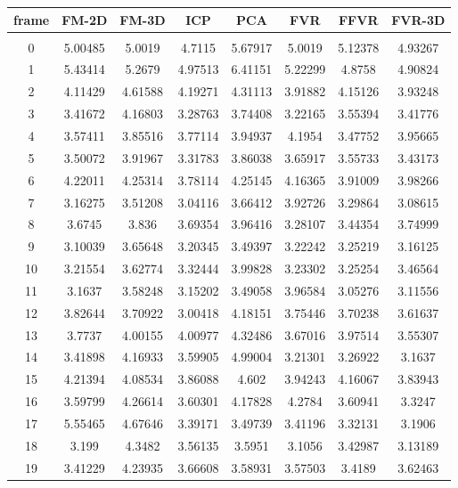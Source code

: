 \begin{center}
\begin{longtable}{cccccccc}
\hline
\textbf{frame} & \textbf{FM-2D} & \textbf{FM-3D} & \textbf{ICP} & \textbf{PCA} & \textbf{FVR} & \textbf{FFVR} & \textbf{FVR-3D} \\
\hline \\
0 & 5.00485 & 5.0019 & 4.7115 & 5.67917 & 5.0019 & 5.12378 & 4.93267\\
1 & 5.43414 & 5.2679 & 4.97513 & 6.41151 & 5.22299 & 4.8758 & 4.90824\\
2 & 4.11429 & 4.61588 & 4.19271 & 4.31113 & 3.91882 & 4.15126 & 3.93248\\
3 & 3.41672 & 4.16803 & 3.28763 & 3.74408 & 3.22165 & 3.55394 & 3.41776\\
4 & 3.57411 & 3.85516 & 3.77114 & 3.94937 & 4.1954 & 3.47752 & 3.95665\\
5 & 3.50072 & 3.91967 & 3.31783 & 3.86038 & 3.65917 & 3.55733 & 3.43173\\
6 & 4.22011 & 4.25314 & 3.78114 & 4.25145 & 4.16365 & 3.91009 & 3.98266\\
7 & 3.16275 & 3.51208 & 3.04116 & 3.66412 & 3.92726 & 3.29864 & 3.08615\\
8 & 3.6745 & 3.836 & 3.69354 & 3.96416 & 3.28107 & 3.44354 & 3.74999\\
9 & 3.10039 & 3.65648 & 3.20345 & 3.49397 & 3.22242 & 3.25219 & 3.16125\\
10 & 3.21554 & 3.62774 & 3.32444 & 3.99828 & 3.23302 & 3.25254 & 3.46564\\
11 & 3.1637 & 3.58248 & 3.15202 & 3.49058 & 3.96584 & 3.05276 & 3.11556\\
12 & 3.82644 & 3.70922 & 3.00418 & 4.18151 & 3.75446 & 3.70238 & 3.61637\\
13 & 3.7737 & 4.00155 & 4.00977 & 4.32486 & 3.67016 & 3.97514 & 3.55307\\
14 & 3.41898 & 4.16933 & 3.59905 & 4.99004 & 3.21301 & 3.26922 & 3.1637\\
15 & 4.21394 & 4.08534 & 3.86088 & 4.602 & 3.94243 & 4.16067 & 3.83943\\
16 & 3.59799 & 4.26614 & 3.60301 & 4.17828 & 4.2784 & 3.60941 & 3.3247\\
17 & 5.55465 & 4.67646 & 3.39171 & 3.49739 & 3.41196 & 3.32131 & 3.1906\\
18 & 3.199 & 4.3482 & 3.56135 & 3.5951 & 3.1056 & 3.42987 & 3.13189\\
19 & 3.41229 & 4.23935 & 3.66608 & 3.58931 & 3.57503 & 3.4189 & 3.62463\\

\end{longtable}
\end{center}
